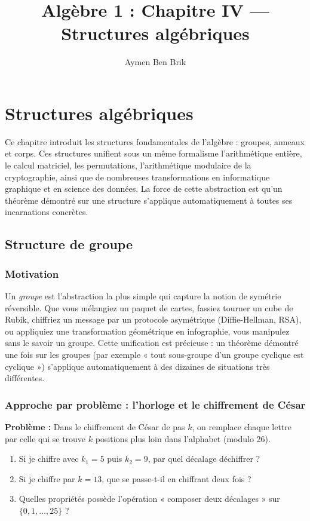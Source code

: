 \documentclass[12pt,a4paper]{report}
\title{Algèbre 1 : Chapitre IV --- Structures algébriques}
\author{Aymen Ben Brik}
\date{}
\theoremstyle{definition}
\theoremstyle{remark}
\begin{document}
\maketitle

\setcounter{chapter}{3}
\chapter{Structures algébriques}

Ce chapitre introduit les structures fondamentales de l'algèbre : groupes, anneaux et corps. Ces structures unifient sous un même formalisme l'arithmétique entière, le calcul matriciel, les permutations, l'arithmétique modulaire de la cryptographie, ainsi que de nombreuses transformations en informatique graphique et en science des données. La force de cette abstraction est qu'un théorème démontré sur une structure s'applique automatiquement à toutes ses incarnations concrètes.

\section{Structure de groupe}

\subsection{Motivation}
Un \emph{groupe} est l'abstraction la plus simple qui capture la notion de symétrie réversible. Que vous mélangiez un paquet de cartes, fassiez tourner un cube de Rubik, chiffriez un message par un protocole asymétrique (Diffie-Hellman, RSA), ou appliquiez une transformation géométrique en infographie, vous manipulez sans le savoir un groupe. Cette unification est précieuse : un théorème démontré une fois sur les groupes (par exemple « tout sous-groupe d'un groupe cyclique est cyclique ») s'applique automatiquement à des dizaines de situations très différentes.

\subsection{Approche par problème : l'horloge et le chiffrement de César}
\textbf{Problème :} Dans le chiffrement de César de pas $k$, on remplace chaque lettre par celle qui se trouve $k$ positions plus loin dans l'alphabet (modulo 26).
\begin{enumerate}
    \item Si je chiffre avec $k_1 = 5$ puis $k_2 = 9$, par quel décalage déchiffrer ?
    \item Si je chiffre par $k = 13$, que se passe-t-il en chiffrant deux fois ?
    \item Quelles propriétés possède l'opération « composer deux décalages » sur $\{0, 1, \dots, 25\}$ ?
\end{enumerate}
\end{document}

